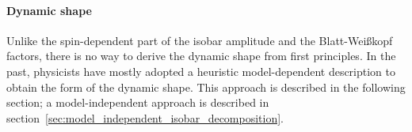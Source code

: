     \paragraph{Dynamic shape}
    Unlike the spin-dependent part of the isobar amplitude and the Blatt-Wei\ss{}kopf factors, there is no way to derive the dynamic shape from first principles.
    In the past, physicists have mostly adopted a heuristic model-dependent description to obtain the form of the dynamic shape.
    This approach is described in the following section; a model-independent approach is described in section~\ref{sec:model_independent_isobar_decomposition}.


    
    
